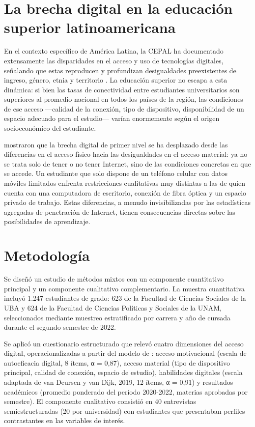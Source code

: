 \documentclass{article}
\begin{document}
\section{La brecha digital en la educación superior latinoamericana}
En el contexto específico de América Latina, la CEPAL ha documentado extensamente las disparidades en el acceso y uso de tecnologías digitales, señalando que estas reproducen y profundizan desigualdades preexistentes de ingreso, género, etnia y territorio \autocite*{2566-CEPAL2021}. La educación superior no escapa a esta dinámica: si bien las tasas de conectividad entre estudiantes universitarios son superiores al promedio nacional en todos los países de la región, las condiciones de ese acceso —calidad de la conexión, tipo de dispositivo, disponibilidad de un espacio adecuado para el estudio— varían enormemente según el origen socioeconómico del estudiante.

\autocite{2564-VANDEURSENA2019} mostraron que la brecha digital de primer nivel se ha desplazado desde las diferencias en el acceso físico hacia las desigualdades en el acceso material: ya no se trata solo de tener o no tener Internet, sino de las condiciones concretas en que se accede. Un estudiante que solo dispone de un teléfono celular con datos móviles limitados enfrenta restricciones cualitativas muy distintas a las de quien cuenta con una computadora de escritorio, conexión de fibra óptica y un espacio privado de trabajo. Estas diferencias, a menudo invisibilizadas por las estadísticas agregadas de penetración de Internet, tienen consecuencias directas sobre las posibilidades de aprendizaje.


\section{Metodología}
Se diseñó un estudio de métodos mixtos con un componente cuantitativo principal y un componente cualitativo complementario. La muestra cuantitativa incluyó 1.247 estudiantes de grado: 623 de la Facultad de Ciencias Sociales de la UBA y 624 de la Facultad de Ciencias Políticas y Sociales de la UNAM, seleccionados mediante muestreo estratificado por carrera y año de cursada durante el segundo semestre de 2022.

Se aplicó un cuestionario estructurado que relevó cuatro dimensiones del acceso digital, operacionalizadas a partir del modelo de \autocite*{2563-VANDIJK2020}: acceso motivacional (escala de autoeficacia digital, 8 ítems, α = 0,87), acceso material (tipo de dispositivo principal, calidad de conexión, espacio de estudio), habilidades digitales (escala adaptada de van Deursen y van Dijk, 2019, 12 ítems, α = 0,91) y resultados académicos (promedio ponderado del período 2020-2022, materias aprobadas por semestre). El componente cualitativo consistió en 40 entrevistas semiestructuradas (20 por universidad) con estudiantes que presentaban perfiles contrastantes en las variables de interés.
\end{document}
